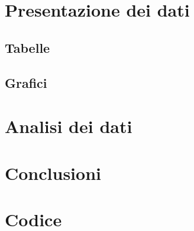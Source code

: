 \documentclass[10pt,a4paper]{article} %
\begin{document}
\newpage
\section{Presentazione dei dati}			
	\subsection{Tabelle}
	
	\clearpage
	\subsection{Grafici}
	
	
\clearpage
\section{Analisi dei dati}
	

\section{Conclusioni}
	
	
\section{Codice}
	
	

\end{document}

